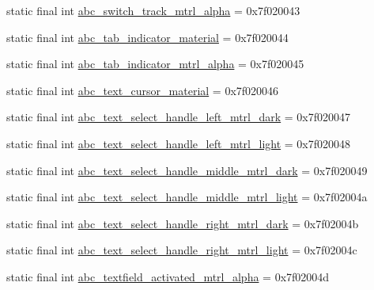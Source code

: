 \begin{CompactItemize}
\item 
static final int \hyperlink{classandroid_1_1support_1_1v7_1_1mediarouter_1_1_r_1_1drawable_edee19e5118e18efb5e4b6cd49c7115e}{abc\_\-switch\_\-track\_\-mtrl\_\-alpha} = 0x7f020043
\item 
static final int \hyperlink{classandroid_1_1support_1_1v7_1_1mediarouter_1_1_r_1_1drawable_31f2dabaedf52ef8f9073efc220a964b}{abc\_\-tab\_\-indicator\_\-material} = 0x7f020044
\item 
static final int \hyperlink{classandroid_1_1support_1_1v7_1_1mediarouter_1_1_r_1_1drawable_7cf10e8a4916a41583ab9716ef0d431e}{abc\_\-tab\_\-indicator\_\-mtrl\_\-alpha} = 0x7f020045
\item 
static final int \hyperlink{classandroid_1_1support_1_1v7_1_1mediarouter_1_1_r_1_1drawable_dcbd281dc9aee566c7fea7bf28601a1c}{abc\_\-text\_\-cursor\_\-material} = 0x7f020046
\item 
static final int \hyperlink{classandroid_1_1support_1_1v7_1_1mediarouter_1_1_r_1_1drawable_8f19f56764d64eebd4a37e111c62d956}{abc\_\-text\_\-select\_\-handle\_\-left\_\-mtrl\_\-dark} = 0x7f020047
\item 
static final int \hyperlink{classandroid_1_1support_1_1v7_1_1mediarouter_1_1_r_1_1drawable_f1f7c5aa3582abc68824ddc9a274a24c}{abc\_\-text\_\-select\_\-handle\_\-left\_\-mtrl\_\-light} = 0x7f020048
\item 
static final int \hyperlink{classandroid_1_1support_1_1v7_1_1mediarouter_1_1_r_1_1drawable_608467a812ef14105a045b9201a20acf}{abc\_\-text\_\-select\_\-handle\_\-middle\_\-mtrl\_\-dark} = 0x7f020049
\item 
static final int \hyperlink{classandroid_1_1support_1_1v7_1_1mediarouter_1_1_r_1_1drawable_dc1aef43e37a66aa001ea60e3c5d0ce8}{abc\_\-text\_\-select\_\-handle\_\-middle\_\-mtrl\_\-light} = 0x7f02004a
\item 
static final int \hyperlink{classandroid_1_1support_1_1v7_1_1mediarouter_1_1_r_1_1drawable_21a91fe338dc91efa3ab0b66df7cb412}{abc\_\-text\_\-select\_\-handle\_\-right\_\-mtrl\_\-dark} = 0x7f02004b
\item 
static final int \hyperlink{classandroid_1_1support_1_1v7_1_1mediarouter_1_1_r_1_1drawable_a7e3d287257031586b88e33191bd65e0}{abc\_\-text\_\-select\_\-handle\_\-right\_\-mtrl\_\-light} = 0x7f02004c
\item 
static final int \hyperlink{classandroid_1_1support_1_1v7_1_1mediarouter_1_1_r_1_1drawable_e404a129b77eccaa5886f38262932fd0}{abc\_\-textfield\_\-activated\_\-mtrl\_\-alpha} = 0x7f02004d
\item 

\end{CompactItemize}
